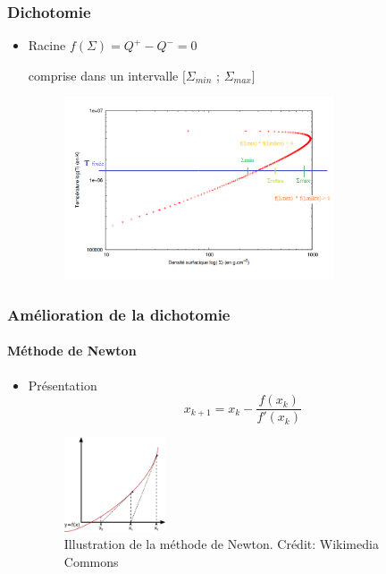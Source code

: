 
\begin{frame}
\frametitle{Dichotomie}

   \begin{itemize}
      \item Racine $f(\Sigma) = Q^+ - Q^- = 0$ 
      
      comprise dans un intervalle $[\Sigma_{min}$ ; $\Sigma_{max}]$
      \\
      \begin{figure}[htb!]
         \includegraphics[width=8cm]{figures/dicho_2.png}
      \end{figure}
   \end{itemize}
\end{frame}



\begin{frame}
\frametitle{Amélioration de la dichotomie}
\framesubtitle{Méthode de Newton}

   \begin{itemize}
      \item Présentation
      \\
      \begin{equation}
         x_{k+1} = x_k - \frac{f(x_k)}{f'(x_k)}
      \end{equation}

      \begin{figure}[htb!]
         \includegraphics[width=3cm]{figures/Newton_method.png}
         \caption{Illustration de la méthode de Newton. Crédit: Wikimedia Commons}
      \end{figure}

   \end{itemize}
\end{frame}

